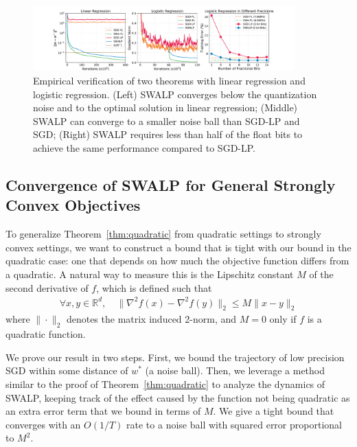 \documentclass{article}
\begin{document}
\begin{figure}[t]
    \centering
    \includegraphics[width=0.9\textwidth]{figures/Regression.pdf}
    \caption{Empirical verification of two theorems with linear regression and logistic regression. (Left) SWALP converges below the quantization noise and to the optimal solution in linear regression; (Middle) SWALP can converge to a smaller noise ball than SGD-LP and SGD; (Right) SWALP requires less than half of the float bits to achieve the same performance compared to SGD-LP.
    }
    \label{fig:convergence}
\end{figure}


\subsection{Convergence of SWALP for General Strongly Convex Objectives}\label{sec:convergence-strongly-convex}

To generalize Theorem~\ref{thm:quadratic} from quadratic settings to strongly convex settings, we want to construct a bound that is tight with our bound in the quadratic case: one that depends on how much the objective function differs from a quadratic.
A natural way to measure this is the Lipschitz constant $M$ of the second derivative of $f$, which is defined such that
\begin{align*}
{\textstyle
\forall x, y \in \mathbb{R}^d, \hspace{1em} \| \nabla^2 f(x) - \nabla^2 f(y) \|_2 \le M \| x - y \|_2
}
\end{align*}
where $\| \cdot \|_2$ denotes the matrix induced 2-norm, and $M = 0$ only if $f$ is a quadratic function.

We prove our result in two steps.
First, we bound the trajectory of low precision SGD within some distance of $w^*$ (a noise ball).
Then, we leverage a method similar to the proof of Theorem~\ref{thm:quadratic} to analyze the dynamics of SWALP, keeping track of the effect caused by the function not being quadratic as an extra error term that we bound in terms of $M$.
We give a tight bound that converges with an $O(1/T)$ rate to a noise ball with squared error proportional to $M^2$.
\end{document}
